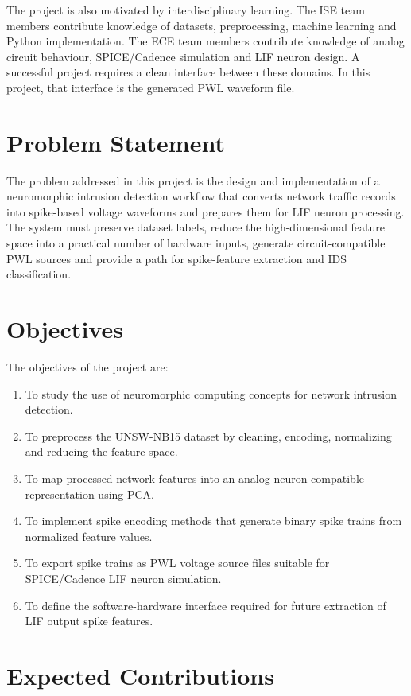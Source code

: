 The project is also motivated by interdisciplinary learning. The ISE team members contribute knowledge of datasets, preprocessing, machine learning and Python implementation. The ECE team members contribute knowledge of analog circuit behaviour, SPICE/Cadence simulation and LIF neuron design. A successful project requires a clean interface between these domains. In this project, that interface is the generated PWL waveform file.

\section[Problem Statement]{\textbf{Problem Statement}}

The problem addressed in this project is the design and implementation of a neuromorphic intrusion detection workflow that converts network traffic records into spike-based voltage waveforms and prepares them for LIF neuron processing. The system must preserve dataset labels, reduce the high-dimensional feature space into a practical number of hardware inputs, generate circuit-compatible PWL sources and provide a path for spike-feature extraction and IDS classification.

\section[Objectives]{\textbf{Objectives}}

The objectives of the project are:
\begin{enumerate}
\item To study the use of neuromorphic computing concepts for network intrusion detection.
\item To preprocess the UNSW-NB15 dataset by cleaning, encoding, normalizing and reducing the feature space.
\item To map processed network features into an analog-neuron-compatible representation using PCA.
\item To implement spike encoding methods that generate binary spike trains from normalized feature values.
\item To export spike trains as PWL voltage source files suitable for SPICE/Cadence LIF neuron simulation.
\item To define the software-hardware interface required for future extraction of LIF output spike features.
\end{enumerate}

\section[Expected Contributions]{\textbf{Expected Contributions}}

